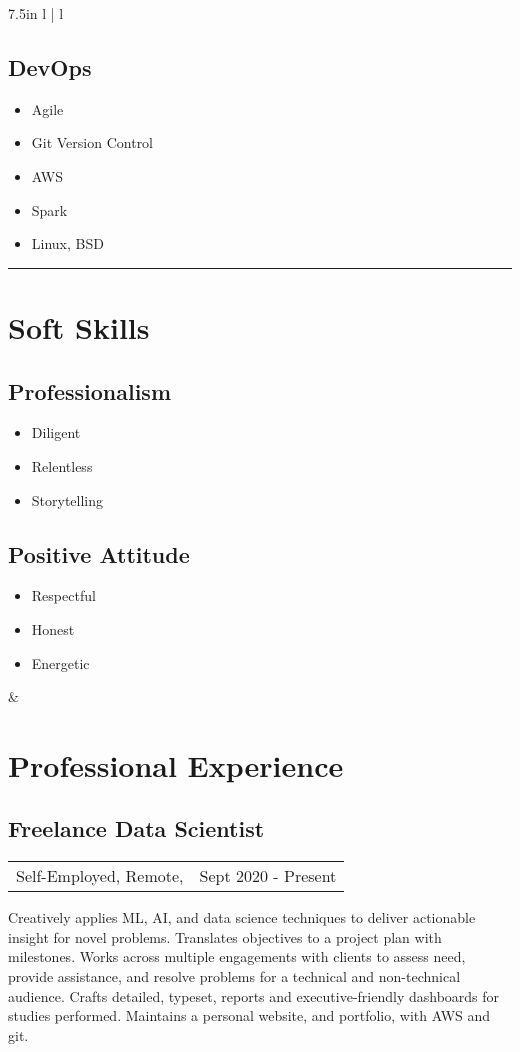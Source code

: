 \documentclass{article}
\begin{document}
\begin{tabular*}{7.5in}{ l | l}
\begin{minipage}[t]{2.0in}
	\subsection*{DevOps}
	\begin{itemize}[noitemsep]
		\item Agile
		\item Git Version Control
		\item AWS
		\item Spark
		\item Linux, BSD
	\end{itemize}
	\hrule
	\section*{Soft Skills}
	\subsection*{Professionalism}
	\begin{itemize}[noitemsep]
		\item Diligent
		\item Relentless
		\item Storytelling
	\end{itemize}
	\subsection*{Positive Attitude}
	\begin{itemize}[noitemsep]
		\item Respectful
		\item Honest
		\item Energetic
	\end{itemize}
	\smallskip
	\end{minipage} &
	\begin{minipage}[t]{5.25in}
	\section*{Professional Experience}
	\subsection*{Freelance Data Scientist}
	\begin{tabular*}{\columnwidth}{@{\extracolsep{\fill}}lr}
		Self-Employed, Remote, & Sept 2020 - Present
	\end{tabular*}
	Creatively applies ML, AI, and data science techniques to deliver actionable insight for novel problems.
	Translates objectives to a project plan with milestones.
	Works across multiple engagements with clients to assess need, provide assistance, and resolve problems for a technical and non-technical audience.
	Crafts detailed, typeset, reports and executive-friendly dashboards for studies performed.
	Maintains a personal website, and portfolio, with AWS and git.
	\medskip

\end{minipage}
\end{tabular*}
\end{document}
